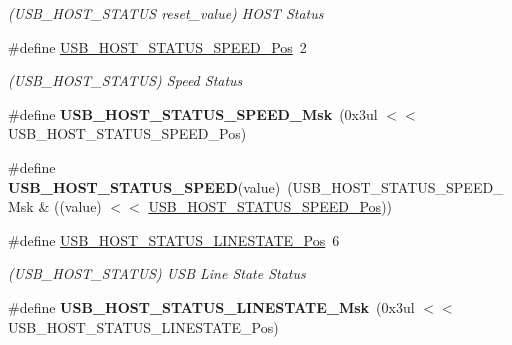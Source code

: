 \begin{DoxyCompactItemize}
\begin{DoxyCompactList}\small\item\em (U\+S\+B\+\_\+\+H\+O\+S\+T\+\_\+\+S\+T\+A\+T\+U\+S reset\+\_\+value) H\+O\+S\+T Status \end{DoxyCompactList}\item 
\hypertarget{group___s_a_m_l21___u_s_b_gab570e40f390c296f344a8201c7bae6cb}{}\#define \hyperlink{group___s_a_m_l21___u_s_b_gab570e40f390c296f344a8201c7bae6cb}{U\+S\+B\+\_\+\+H\+O\+S\+T\+\_\+\+S\+T\+A\+T\+U\+S\+\_\+\+S\+P\+E\+E\+D\+\_\+\+Pos}~2\label{group___s_a_m_l21___u_s_b_gab570e40f390c296f344a8201c7bae6cb}

\begin{DoxyCompactList}\small\item\em (U\+S\+B\+\_\+\+H\+O\+S\+T\+\_\+\+S\+T\+A\+T\+U\+S) Speed Status \end{DoxyCompactList}\item 
\hypertarget{group___s_a_m_l21___u_s_b_gabd6ad646051083fd8a4686934ccfa45a}{}\#define {\bfseries U\+S\+B\+\_\+\+H\+O\+S\+T\+\_\+\+S\+T\+A\+T\+U\+S\+\_\+\+S\+P\+E\+E\+D\+\_\+\+Msk}~(0x3ul $<$$<$ U\+S\+B\+\_\+\+H\+O\+S\+T\+\_\+\+S\+T\+A\+T\+U\+S\+\_\+\+S\+P\+E\+E\+D\+\_\+\+Pos)\label{group___s_a_m_l21___u_s_b_gabd6ad646051083fd8a4686934ccfa45a}

\item 
\hypertarget{group___s_a_m_l21___u_s_b_ga9b63e8d29799421718edcd34847a2564}{}\#define {\bfseries U\+S\+B\+\_\+\+H\+O\+S\+T\+\_\+\+S\+T\+A\+T\+U\+S\+\_\+\+S\+P\+E\+E\+D}(value)~(U\+S\+B\+\_\+\+H\+O\+S\+T\+\_\+\+S\+T\+A\+T\+U\+S\+\_\+\+S\+P\+E\+E\+D\+\_\+\+Msk \& ((value) $<$$<$ \hyperlink{group___s_a_m_l21___u_s_b_gab570e40f390c296f344a8201c7bae6cb}{U\+S\+B\+\_\+\+H\+O\+S\+T\+\_\+\+S\+T\+A\+T\+U\+S\+\_\+\+S\+P\+E\+E\+D\+\_\+\+Pos}))\label{group___s_a_m_l21___u_s_b_ga9b63e8d29799421718edcd34847a2564}

\item 
\hypertarget{group___s_a_m_l21___u_s_b_ga7920c7422a76bdd54c13a72422a6f45b}{}\#define \hyperlink{group___s_a_m_l21___u_s_b_ga7920c7422a76bdd54c13a72422a6f45b}{U\+S\+B\+\_\+\+H\+O\+S\+T\+\_\+\+S\+T\+A\+T\+U\+S\+\_\+\+L\+I\+N\+E\+S\+T\+A\+T\+E\+\_\+\+Pos}~6\label{group___s_a_m_l21___u_s_b_ga7920c7422a76bdd54c13a72422a6f45b}

\begin{DoxyCompactList}\small\item\em (U\+S\+B\+\_\+\+H\+O\+S\+T\+\_\+\+S\+T\+A\+T\+U\+S) U\+S\+B Line State Status \end{DoxyCompactList}\item 
\hypertarget{group___s_a_m_l21___u_s_b_ga02292fe892984db79c6c4b85e4398bdd}{}\#define {\bfseries U\+S\+B\+\_\+\+H\+O\+S\+T\+\_\+\+S\+T\+A\+T\+U\+S\+\_\+\+L\+I\+N\+E\+S\+T\+A\+T\+E\+\_\+\+Msk}~(0x3ul $<$$<$ U\+S\+B\+\_\+\+H\+O\+S\+T\+\_\+\+S\+T\+A\+T\+U\+S\+\_\+\+L\+I\+N\+E\+S\+T\+A\+T\+E\+\_\+\+Pos)\label{group___s_a_m_l21___u_s_b_ga02292fe892984db79c6c4b85e4398bdd}


\end{DoxyCompactItemize}
